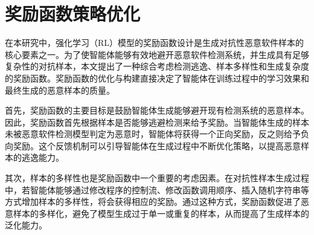 \section{奖励函数策略优化}


在本研究中，强化学习（RL）模型的奖励函数设计是生成对抗性恶意软件样本的核心要素之一。为了使智能体能够有效地避开恶意软件检测系统，并生成具有足够复杂性的对抗样本，本文提出了一种综合考虑检测逃逸、样本多样性和生成复杂度的奖励函数。奖励函数的优化与构建直接决定了智能体在训练过程中的学习效果和最终生成的恶意样本的质量。


首先，奖励函数的主要目标是鼓励智能体生成能够避开现有检测系统的恶意样本。因此，奖励函数首先根据样本是否能够逃避检测来给予奖励。当智能体生成的样本未被恶意软件检测模型判定为恶意时，智能体将获得一个正向奖励，反之则给予负向奖励。这个反馈机制可以引导智能体在生成过程中不断优化策略，以提高恶意样本的逃逸能力。


其次，样本的多样性也是奖励函数中一个重要的考虑因素。在对抗性样本生成过程中，若智能体能够通过修改程序的控制流、修改函数调用顺序、插入随机字符串等方式增加样本的多样性，将会获得相应的奖励。通过这种方式，奖励函数促进了恶意样本的多样化，避免了模型生成过于单一或重复的样本，从而提高了生成样本的泛化能力。


